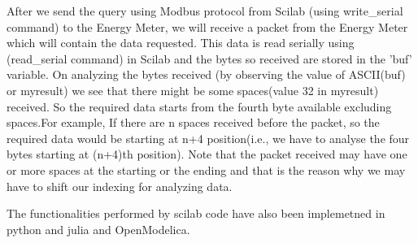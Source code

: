 After we send the query using Modbus protocol from Scilab (using
write\_serial command) to the Energy Meter, we will receive a packet
from the Energy Meter which will contain the data requested. This data
is read serially using (read\_serial command) in Scilab and the bytes
so received are stored in the 'buf' variable. On analyzing the bytes
received (by observing the value of ASCII(buf) or myresult) we see
that there might be some spaces(value 32 in myresult) received. So the
required data starts from the fourth byte available excluding
spaces.For example, If there are n spaces received before the packet,
so the required data would be starting at n+4 position(i.e., we have
to analyse the four bytes starting at (n+4)th position). Note that the
packet received may have one or more spaces at the starting or the
ending and that is the reason why we may have to shift our indexing
for analyzing data.

The functionalities performed by scilab code have also been implemetned in 
python and julia and OpenModelica.




%   

%   

%   

